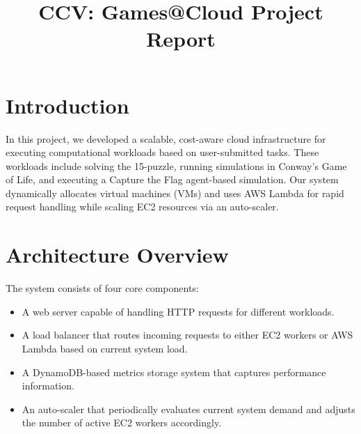 \documentclass[conference]{IEEEtran}
\begin{document}
\title{CCV: Games@Cloud Project Report}

\author{
  \and
  \and
}

\maketitle

\section{Introduction}
In this project, we developed a scalable, cost-aware cloud infrastructure for
executing computational workloads based on user-submitted tasks. These workloads
include solving the 15-puzzle, running simulations in Conway's Game of Life, and
executing a Capture the Flag agent-based simulation. Our system dynamically
allocates virtual machines (VMs) and uses AWS Lambda for rapid request handling
while scaling EC2 resources via an auto-scaler.

\section{Architecture Overview}
The system consists of four core components:

\begin{itemize}
    \item A web server capable of handling HTTP requests for different
    workloads.
    \item A load balancer that routes incoming requests to either EC2 workers or
    AWS Lambda based on current system load.
    \item A DynamoDB-based metrics storage system that captures performance
    information.
    \item An auto-scaler that periodically evaluates current system demand and
    adjusts the number of active EC2 workers accordingly.
\end{itemize}
\end{document}

